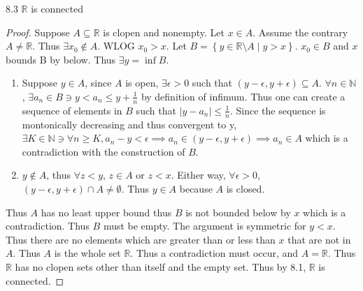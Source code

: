 \documentclass{article}
\newcommand*{\subeq}{\subseteq}
\newcommand*{\empset}{\emptyset}
\newcommand{\R}{\mathbb{R}}
\newcommand{\N}{\mathbb{N}}
\newcommand{\abs}[1]{\left\lvert #1\right\rvert}
\begin{document}
\begin{claim}{8.3}\label{Claim 8.3.}
    $\R$ is connected 
\end{claim}
\begin{proof}
    Suppose $A \subeq \R$ is clopen and nonempty. Let $x \in A$. Assume the contrary $A \neq \R$. Thus $\exists x_0 \not \in A$. WLOG $x_0 > x$. Let $B = \left\{ y \in \R \setminus A \mid y > x \right\}$. $x_0 \in B$ and $x$ bounds B by below. Thus $\exists y = \inf B$. 

    \begin{enumerate}
        \item Suppose $y \in A$, since $A$ is open, $\exists \epsilon > 0$ such that $(y - \epsilon, y + \epsilon) \subeq A$. $\forall n \in \N$, $\exists a_n \in B \ni y < a_n \leq y + \frac{1}{n}$ by definition of infimum. Thus one can create a sequence of elements in $B$ such that $\abs{y - a_n} \leq \frac{1}{n}$. Since the sequence is montonically decreasing and thus convergent to y, $\exists K \in \N \ni \forall n \geq K, a_n - y < \epsilon \implies a_n \in (y - \epsilon, y + \epsilon) \implies a_n \in A$ which is a contradiction with the construction of $B$. 
        \item $y \not \in A$, thus $\forall z < y$, $z \in A$ or $z < x$. Either way, $\forall \epsilon > 0$, $(y - \epsilon, y + \epsilon) \cap A \neq \empset$. Thus $y \in A$ because $A$ is closed. 
    \end{enumerate}

    Thus $A$ has no least upper bound thus $B$ is not bounded below by $x$ which is a contradiction. Thus $B$ must be empty. The argument is symmetric for $y < x$. Thus there are no elements which are greater than or less than $x$ that are not in $A$. Thus $A$ is the whole set $\R$. Thus a contradiction must occur, and $A = \R$. Thus $\R$ has no clopen sets other than itself and the empty set. Thus by 8.1, $\R$ is connected.                 
\end{proof}

\bigskip
\end{document}
